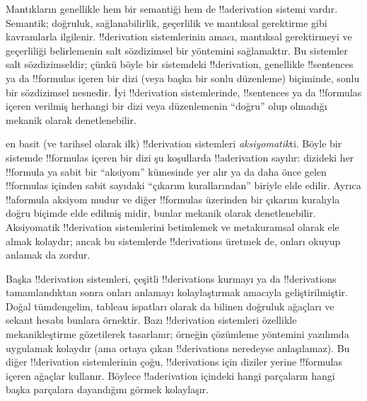 \documentclass[../../../include/open-logic-section]{subfiles}
\begin{document}
      {}
      {}


Mantıkların genellikle hem bir semantiği hem de !!a{derivation} sistemi
vardır. Semantik; doğruluk, sağlanabilirlik, geçerlilik ve mantıksal gerektirme
gibi kavramlarla ilgilenir. !!{derivation} sistemlerinin amacı, mantıksal
gerektirmeyi ve geçerliliği belirlemenin salt sözdizimsel bir yöntemini
sağlamaktır. Bu sistemler salt sözdizimseldir; çünkü böyle bir sistemdeki
!!{derivation}, genellikle !!{sentence}s ya da !!{formula}s içeren bir dizi
(veya başka bir sonlu düzenleme) biçiminde, sonlu bir sözdizimsel nesnedir.
İyi !!{derivation} sistemlerinde, !!{sentence}s ya da !!{formula}s içeren
verilmiş herhangi bir dizi veya düzenlemenin “doğru” olup olmadığı mekanik
olarak denetlenebilir.

 en basit
(ve tarihsel olarak ilk) !!{derivation}
sistemleri \emph{aksiyomatik}ti. Böyle bir sistemde !!{formula}s içeren bir
dizi şu koşullarda !!a{derivation} sayılır: dizideki her !!{formula} ya sabit
bir “aksiyom” kümesinde yer alır ya da daha önce gelen !!{formula}s içinden
sabit sayıdaki “çıkarım kurallarından” biriyle elde edilir. Ayrıca !!a{formula} aksiyom
mudur ve diğer !!{formula}s üzerinden bir çıkarım kuralıyla doğru biçimde
elde edilmiş midir, bunlar mekanik olarak denetlenebilir. Aksiyomatik
!!{derivation} sistemlerini betimlemek ve metakuramsal olarak ele almak
kolaydır; ancak bu sistemlerde !!{derivation}s üretmek de, onları okuyup
anlamak da zordur.

Başka !!{derivation} sistemleri, çeşitli !!{derivation}s kurmayı ya da
!!{derivation}s tamamlandıktan sonra onları anlamayı kolaylaştırmak amacıyla
geliştirilmiştir. Doğal tümdengelim, tableau ispatları olarak da bilinen
doğruluk ağaçları ve sekant hesabı bunlara örnektir. Bazı !!{derivation}
sistemleri özellikle mekanikleştirme gözetilerek tasarlanır; örneğin
çözümleme yöntemini yazılımda uygulamak kolaydır (ama ortaya çıkan
!!{derivation}s neredeyse anlaşılamaz). Bu diğer !!{derivation}
sistemlerinin çoğu, !!{derivation}s için diziler yerine !!{formula}s içeren
ağaçlar kullanır. Böylece !!a{derivation} içindeki hangi parçaların hangi
başka parçalara dayandığını görmek kolaylaşır.
\end{document}
